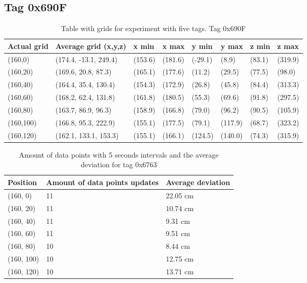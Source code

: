 \subsection{Tag 0x690F}
\begin{table}[H]
    \centering
    \begin{tabular}{|l|l|l|l|l|l|l|l|}
        \hline
        Actual grid & Average grid (x,y,z)  & x min   & x max   & y min   & y max   & z min  & z max   \\ \hline
        (160,0)     & (174.4, -13.1, 249.4) & (153.6) & (181.6) & (-29.1) & (8.9)   & (83.1) & (319.9) \\ \hline
        (160,20)    & (169.6, 20.8, 87.3)   & (165.1) & (177.6) & (11.2)  & (29.5)  & (77.5) & (98.0)  \\ \hline
        (160,40)    & (164.4, 35.4, 130.4)  & (154.3) & (172.9) & (26.8)  & (45.8)  & (84.4) & (313.3) \\ \hline
        (160,60)    & (168.2, 62.4, 131.8)  & (161.8) & (180.5) & (55.3)  & (69.6)  & (91.8) & (297.5) \\ \hline
        (160,80)    & (163.7, 86.9, 96.3)   & (158.9) & (166.8) & (79.0)  & (96.2)  & (90.5) & (105.9) \\ \hline
        (160,100)   & (166.8, 95.3, 222.9)  & (155.1) & (177.5) & (79.1)  & (117.9) & (68.7) & (323.2) \\ \hline
        (160,120)   & (162.1, 133.1, 153.3) & (155.1) & (166.1) & (124.5) & (140.0) & (74.3) & (315.9) \\ \hline
    \end{tabular}
    \caption{Table with grids for experiment with five tags. Tag 0x690F}
\end{table}

\begin{table}[H]
    \centering
    \begin{tabular}{|l|l|l|}
        \hline
        Position   & Amount of data points updates & Average deviation \\ \hline
        (160, 0)   & 11                            & 22.05 cm          \\ \hline
        (160, 20)  & 11                            & 10.74 cm          \\ \hline
        (160, 40)  & 11                            & 9.31 cm           \\ \hline
        (160, 60)  & 11                            & 9.51 cm           \\ \hline
        (160, 80)  & 10                            & 8.44 cm           \\ \hline
        (160, 100) & 10                            & 12.75 cm          \\ \hline
        (160, 120) & 10                            & 13.71 cm          \\ \hline
    \end{tabular}
    \caption{Amount of data points with 5 seconds intervals and the average deviation for tag 0x6763}
\end{table}

